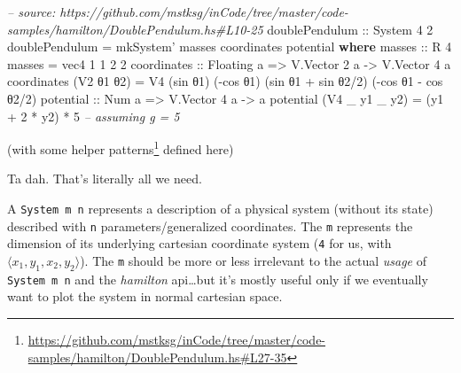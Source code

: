 \documentclass[]{article}
\newenvironment{Shaded}{}{}
\newcommand{\KeywordTok}[1]{\textcolor[rgb]{0.00,0.44,0.13}{\textbf{{#1}}}}
\newcommand{\DataTypeTok}[1]{\textcolor[rgb]{0.56,0.13,0.00}{{#1}}}
\newcommand{\DecValTok}[1]{\textcolor[rgb]{0.25,0.63,0.44}{{#1}}}
\newcommand{\CommentTok}[1]{\textcolor[rgb]{0.38,0.63,0.69}{\textit{{#1}}}}
\newcommand{\OtherTok}[1]{\textcolor[rgb]{0.00,0.44,0.13}{{#1}}}
\newcommand{\FunctionTok}[1]{\textcolor[rgb]{0.02,0.16,0.49}{{#1}}}
\newcommand{\NormalTok}[1]{{#1}}
\renewcommand{\href}[2]{#2\footnote{\url{#1}}}
\begin{document}
\begin{Shaded}
\begin{Highlighting}[]
\CommentTok{-- source: https://github.com/mstksg/inCode/tree/master/code-samples/hamilton/DoublePendulum.hs#L10-25}
\OtherTok{doublePendulum ::} \DataTypeTok{System} \DecValTok{4} \DecValTok{2}
\NormalTok{doublePendulum }\FunctionTok{=} \NormalTok{mkSystem' masses coordinates potential}
  \KeywordTok{where}
\OtherTok{    masses ::} \DataTypeTok{R} \DecValTok{4}
    \NormalTok{masses }\FunctionTok{=} \NormalTok{vec4 }\DecValTok{1} \DecValTok{1} \DecValTok{2} \DecValTok{2}
    \NormalTok{coordinates}
\OtherTok{        ::} \DataTypeTok{Floating} \NormalTok{a}
        \OtherTok{=>} \DataTypeTok{V.Vector} \DecValTok{2} \NormalTok{a}
        \OtherTok{->} \DataTypeTok{V.Vector} \DecValTok{4} \NormalTok{a}
    \NormalTok{coordinates (}\DataTypeTok{V2} \NormalTok{θ}\DecValTok{1} \NormalTok{θ}\DecValTok{2}\NormalTok{) }\FunctionTok{=} \DataTypeTok{V4} \NormalTok{(sin θ}\DecValTok{1}\NormalTok{)            (}\FunctionTok{-}\NormalTok{cos θ}\DecValTok{1}\NormalTok{)}
                                \NormalTok{(sin θ}\DecValTok{1} \FunctionTok{+} \NormalTok{sin θ}\DecValTok{2}\FunctionTok{/}\DecValTok{2}\NormalTok{) (}\FunctionTok{-}\NormalTok{cos θ}\DecValTok{1} \FunctionTok{-} \NormalTok{cos θ}\DecValTok{2}\FunctionTok{/}\DecValTok{2}\NormalTok{)}
    \NormalTok{potential}
\OtherTok{        ::} \DataTypeTok{Num} \NormalTok{a}
        \OtherTok{=>} \DataTypeTok{V.Vector} \DecValTok{4} \NormalTok{a}
        \OtherTok{->} \NormalTok{a}
    \NormalTok{potential (}\DataTypeTok{V4} \NormalTok{_ y1 _ y2) }\FunctionTok{=} \NormalTok{(y1 }\FunctionTok{+} \DecValTok{2} \FunctionTok{*} \NormalTok{y2) }\FunctionTok{*} \DecValTok{5}    \CommentTok{-- assuming g = 5}
\end{Highlighting}
\end{Shaded}

(with some
\href{https://github.com/mstksg/inCode/tree/master/code-samples/hamilton/DoublePendulum.hs\#L27-35}{helper
patterns} defined here)

Ta dah. That's literally all we need.

A \texttt{System\ m\ n} represents a description of a physical system (without
its state) described with \texttt{n} parameters/generalized coordinates. The
\texttt{m} represents the dimension of its underlying cartesian coordinate
system (\texttt{4} for us, with \(\langle x_1, y_1, x_2, y_2 \rangle\)). The
\texttt{m} should be more or less irrelevant to the actual \emph{usage} of
\texttt{System\ m\ n} and the \emph{hamilton} api\ldots{}but it's mostly useful
only if we eventually want to plot the system in normal cartesian space.
\end{document}
